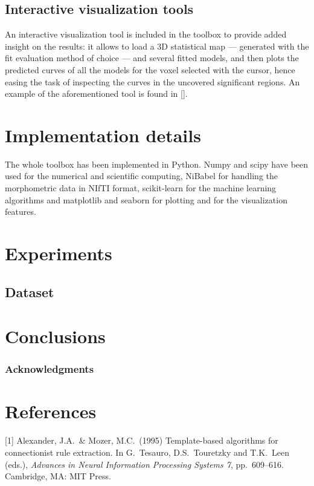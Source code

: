 \documentclass{article}
\begin{document}
\subsection{Interactive visualization tools}

An interactive visualization tool is included in the toolbox to provide added insight on the results: it allows to load a 3D statistical map — generated with the fit evaluation method of choice — and several fitted models, and then plots the predicted curves of all the models for the voxel selected with the cursor, hence easing the task of inspecting the curves in the uncovered significant regions. An example of the aforementioned tool is found in \autoref{}. 

\section{Implementation details}

The whole toolbox has been implemented in Python. Numpy and scipy have been used for the numerical and scientific computing, NiBabel for handling the morphometric data in NIfTI format, scikit-learn for the machine learning algorithms and matplotlib and seaborn for plotting and for the visualization features.

\section{Experiments}

\subsection{Dataset}

\section{Conclusions}

\subsubsection*{Acknowledgments}


\section*{References}
\small

[1] Alexander, J.A.\ \& Mozer, M.C.\ (1995) Template-based algorithms
for connectionist rule extraction. In G.\ Tesauro, D.S.\ Touretzky and
T.K.\ Leen (eds.), {\it Advances in Neural Information Processing
  Systems 7}, pp.\ 609--616. Cambridge, MA: MIT Press.
\end{document}
